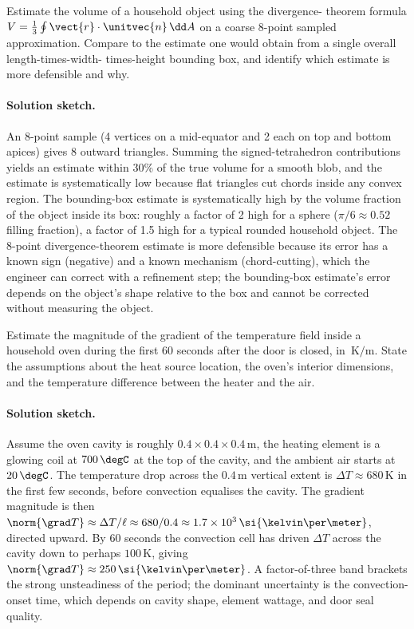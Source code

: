 \begin{exercise}
Estimate the volume of a household object using the divergence-
theorem formula $V = \tfrac{1}{3}\oint \vect{r}\cdot\unitvec{n}
\,\dd A$ on a coarse 8-point sampled approximation. Compare to the
estimate one would obtain from a single overall length-times-width-
times-height bounding box, and identify which estimate is more
defensible and why.

\paragraph{Solution sketch.} An 8-point sample (4 vertices on a
mid-equator and 2 each on top and bottom apices) gives 8 outward
triangles. Summing the signed-tetrahedron contributions yields an
estimate within 30\% of the true volume for a smooth blob, and the
estimate is systematically low because flat triangles cut chords
inside any convex region. The bounding-box estimate is
systematically high by the volume fraction of the object inside its
box: roughly a factor of 2 high for a sphere ($\pi/6 \approx 0.52$
filling fraction), a factor of 1.5 high for a typical rounded
household object. The 8-point divergence-theorem estimate is more
defensible because its error has a known sign (negative) and a
known mechanism (chord-cutting), which the engineer can correct
with a refinement step; the bounding-box estimate's error depends
on the object's shape relative to the box and cannot be corrected
without measuring the object.
\end{exercise}

\begin{exercise}
Estimate the magnitude of the gradient of the temperature field
inside a household oven during the first 60 seconds after the door
is closed, in $\,\si{\kelvin\per\meter}$. State the assumptions
about the heat source location, the oven's interior dimensions, and
the temperature difference between the heater and the air.

\paragraph{Solution sketch.} Assume the oven cavity is roughly
$0.4 \times 0.4 \times 0.4\,\si{\meter}$, the heating element is a
glowing coil at $700\,\degC$ at the top of the cavity, and the
ambient air starts at $20\,\degC$. The temperature drop across the
$0.4\,\si{\meter}$ vertical extent is $\Delta T \approx 680\,
\si{\kelvin}$ in the first few seconds, before convection equalises
the cavity. The gradient magnitude is then $\norm{\grad T}\approx
\Delta T/\ell \approx 680/0.4 \approx 1.7\times 10^{3}\,\si{\kelvin
\per\meter}$, directed upward. By 60 seconds the convection cell
has driven $\Delta T$ across the cavity down to perhaps $100\,
\si{\kelvin}$, giving $\norm{\grad T}\approx 250\,\si{\kelvin\per
\meter}$. A factor-of-three band brackets the strong unsteadiness
of the period; the dominant uncertainty is the convection-onset
time, which depends on cavity shape, element wattage, and door
seal quality.
\end{exercise}


